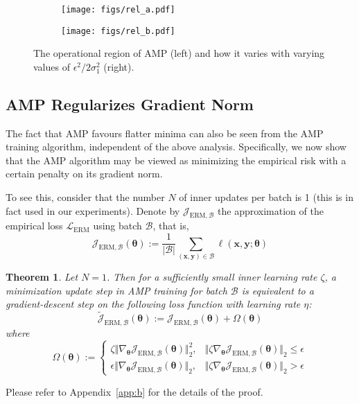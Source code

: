 \documentclass[final]{cvpr}
\newtheorem{theorem}{Theorem}
\begin{document}
\begin{figure}[t]
\centering
\begin{subfigure}{0.49\columnwidth}\centering \texttt{[image: figs/rel\_a.pdf]}\end{subfigure}\begin{subfigure}{0.49\columnwidth}\centering \texttt{[image: figs/rel\_b.pdf]}\end{subfigure}\caption{The operational region of AMP (left) and how it varies with varying values of $\epsilon^2/2\sigma_1^2$ (right).}
\label{fig:rel}
\end{figure}

\subsection{AMP Regularizes Gradient Norm}

The fact that AMP favours flatter minima can also be seen from the AMP training algorithm, independent of the above analysis. Specifically, we now show that the AMP algorithm may be viewed as minimizing the empirical risk with a certain penalty on its gradient norm.

To see this, consider that the number $N$ of inner updates per batch is 1 (this is in fact used in our experiments). Denote by $\mathcal{J}_{\mathrm{ERM},\mathcal{B}}$ the approximation of the empirical loss $\mathcal{L}_\mathrm{ERM}$ using batch $\mathcal{B}$, that is, 
\begin{equation}
\mathcal{J}_{\mathrm{ERM},\mathcal{B}}(\boldsymbol{\theta}):=\frac{1}{|\mathcal{B}|}\sum_{(\boldsymbol{x},\boldsymbol{y})\in\mathcal{B}}\ell(\boldsymbol{x},\boldsymbol{y};\boldsymbol{\theta})
\end{equation}

\begin{theorem}\label{thm2}
Let $N=1$. Then for a sufficiently small inner learning rate $\zeta$, a minimization update step in AMP training for batch $\mathcal{B}$ is equivalent to a gradient-descent step on the following loss function with learning rate $\eta$:
\begin{equation}
\widetilde{\mathcal{J}}_{\mathrm{ERM},\mathcal{B}}(\boldsymbol{\theta}):=\mathcal{J}_{\mathrm{ERM},\mathcal{B}}(\boldsymbol{\theta})+\Omega(\boldsymbol{\theta})
\end{equation}
where
\begin{equation}
\Omega(\boldsymbol{\theta}):=\begin{cases}
\zeta\Vert\nabla_{\boldsymbol{\theta}}\mathcal{J}_{\mathrm{ERM},\mathcal{B}}(\boldsymbol{\theta})\Vert_2^2,&\Vert\zeta\nabla_{\boldsymbol{\theta}}\mathcal{J}_{\mathrm{ERM},\mathcal{B}}(\boldsymbol{\theta})\Vert_2\le\epsilon\\
\epsilon\Vert\nabla_{\boldsymbol{\theta}}\mathcal{J}_{\mathrm{ERM},\mathcal{B}}(\boldsymbol{\theta})\Vert_2,&\Vert\zeta\nabla_{\boldsymbol{\theta}}\mathcal{J}_{\mathrm{ERM},\mathcal{B}}(\boldsymbol{\theta})\Vert_2>\epsilon
\end{cases}
\end{equation}
\end{theorem}
Please refer to Appendix~\ref{app:b} for the details of the proof.
\end{document}
